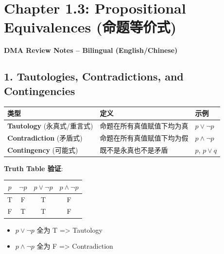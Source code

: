 \documentclass[10pt,a4paper,openany]{ctexbook}
\theoremstyle{definition}
\theoremstyle{remark}
\renewenvironment{quote}
  {\list{}{\leftmargin=1em\rightmargin=0pt\topsep=0.5pt\partopsep=0pt}\item[]}
  {\endlist}
\begin{document}
\newpage

\section{Chapter 1.3: Propositional Equivalences (命题等价式)}

\begin{quote}
\textbf{DMA Review Notes -- Bilingual (English/Chinese)}

\end{quote}
\vspace{-2pt}

\subsection{1. Tautologies, Contradictions, and Contingencies}

\begin{center}
\begin{tabular}{lll}
\hline
类型 & 定义 & 示例 \\ \hline
\textbf{Tautology} (永真式/重言式) & 命题在所有真值赋值下均为真 & $p \lor \neg p$ \\
\textbf{Contradiction} (矛盾式) & 命题在所有真值赋值下均为假 & $p \land \neg p$ \\
\textbf{Contingency} (可能式) & 既不是永真也不是矛盾 & $p$, $p \lor q$ \\
\hline
\end{tabular}

\end{center}

\textbf{Truth Table 验证}:
\begin{center}
\begin{tabular}{cccc}
\hline
$p$ & $\neg p$ & $p \lor \neg p$ & $p \land \neg p$ \\ \hline
T & F & T & F \\
F & T & T & F \\
\hline
\end{tabular}

\end{center}

\begin{itemize}
\item $p \lor \neg p$ 全为 T => Tautology
\item $p \land \neg p$ 全为 F => Contradiction

\end{itemize}

\vspace{-2pt}
\end{document}

